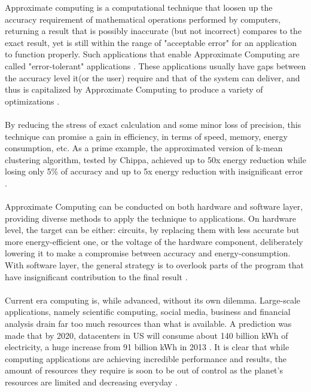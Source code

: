 Approximate computing is a computational technique that loosen up the accuracy requirement of mathematical operations performed by computers, returning a result that is possibly inaccurate (but not incorrect) compares to the exact result, yet is still within the range of "acceptable error" for an application to function properly. Such applications that enable Approximate Computing are called "error-tolerant" applications \cite{7348659}. These applications usually have gaps between the accuracy level it(or the user) require and that of the system can deliver, and thus is capitalized by Approximate Computing to produce a variety of optimizations \cite{AxCSurvey}. \\
~\\
By reducing the stress of exact calculation and some minor loss of precision, this technique can promise a gain in efficiency, in terms of speed, memory, energy consumption, etc. As a prime example, the approximated version of k-mean clustering algorithm, tested by Chippa, achieved up to 50x energy reduction while losing only 5\% of accuracy and up to 5x energy reduction with insignificant error \cite{SEHD}.\\
~\\
Approximate Computing can be conducted on both hardware and software layer, providing diverse methods to apply the technique to applications. On hardware level, the target can be either: circuits, by replacing them with less accurate but more energy-efficient one, or the voltage of the hardware component, deliberately lowering it to make a compromise between accuracy and energy-consumption. With software layer, the general strategy is to overlook parts of the program that have insignificant contribution to the final result \cite{7348659}. \\
~\\
%
Current era computing is, while advanced, without its own dilemma. Large-scale applications, namely scientific computing, social media, business and financial analysis drain far too much resources than what is available. A prediction was made that by 2020, datacenters in US will consume about 140 billion kWh of electricity, a huge increase from 91 billion kWh in 2013 \cite{NRDC}. It is clear that while computing applications are achieving incredible performance and results, the amount of resources they require is soon to be out of control as the planet's resources are limited and decreasing everyday \cite{AxCSurvey}. \\
